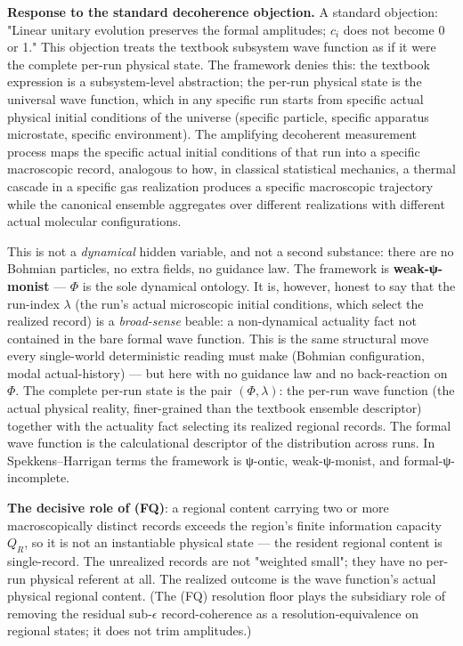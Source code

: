 \documentclass[11pt,a4paper]{article}
\begin{document}
\textbf{Response to the standard decoherence objection.} A standard objection: "Linear unitary evolution preserves the formal amplitudes; $c_i$ does not become 0 or 1." This objection treats the textbook subsystem wave function as if it were the complete per-run physical state. The framework denies this: the textbook expression is a subsystem-level abstraction; the per-run physical state is the universal wave function, which in any specific run starts from specific actual physical initial conditions of the universe (specific particle, specific apparatus microstate, specific environment). The amplifying decoherent measurement process maps the specific actual initial conditions of that run into a specific macroscopic record, analogous to how, in classical statistical mechanics, a thermal cascade in a specific gas realization produces a specific macroscopic trajectory while the canonical ensemble aggregates over different realizations with different actual molecular configurations.

This is not a \emph{dynamical} hidden variable, and not a second substance: there are no Bohmian particles, no extra fields, no guidance law. The framework is \textbf{weak-ψ-monist} — $\Phi$ is the sole dynamical ontology. It is, however, honest to say that the run-index $\lambda$ (the run's actual microscopic initial conditions, which select the realized record) is a \emph{broad-sense} beable: a non-dynamical actuality fact not contained in the bare formal wave function. This is the same structural move every single-world deterministic reading must make (Bohmian configuration, modal actual-history) — but here with no guidance law and no back-reaction on $\Phi$. The complete per-run state is the pair $(\Phi, \lambda)$: the per-run wave function (the actual physical reality, finer-grained than the textbook ensemble descriptor) together with the actuality fact selecting its realized regional records. The formal wave function is the calculational descriptor of the distribution across runs. In Spekkens–Harrigan terms the framework is ψ-ontic, weak-ψ-monist, and formal-ψ-incomplete.

\textbf{The decisive role of (FQ)}: a regional content carrying two or more macroscopically distinct records exceeds the region's finite information capacity $Q_R$, so it is not an instantiable physical state — the resident regional content is single-record. The unrealized records are not "weighted small"; they have no per-run physical referent at all. The realized outcome is the wave function's actual physical regional content. (The (FQ) resolution floor plays the subsidiary role of removing the residual sub-$\epsilon$ record-coherence as a resolution-equivalence on regional states; it does not trim amplitudes.)
\end{document}
